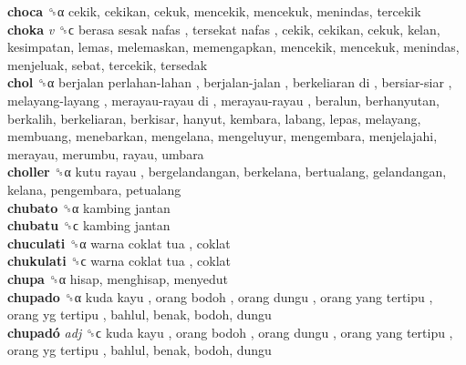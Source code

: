 \textbf{choca} ␝α  cekik, cekikan, cekuk, mencekik, mencekuk, menindas, tercekik  \\
\textbf{choka} \emph{v}  ␝ϲ   berasa sesak nafas ,  tersekat nafas , cekik, cekikan, cekuk, kelan, kesimpatan, lemas, melemaskan, memengapkan, mencekik, mencekuk, menindas, menjeluak, sebat, tercekik, tersedak  \\
\textbf{chol} ␝α   berjalan perlahan-lahan ,  berjalan-jalan ,  berkeliaran di ,  bersiar-siar ,  melayang-layang ,  merayau-rayau di ,  merayau-rayau , beralun, berhanyutan, berkalih, berkeliaran, berkisar, hanyut, kembara, labang, lepas, melayang, membuang, menebarkan, mengelana, mengeluyur, mengembara, menjelajahi, merayau, merumbu, rayau, umbara  \\
\textbf{choller} ␝α   kutu rayau , bergelandangan, berkelana, bertualang, gelandangan, kelana, pengembara, petualang  \\
\textbf{chubato} ␝α   kambing jantan   \\
\textbf{chubatu} ␝ϲ   kambing jantan   \\
\textbf{chuculati} ␝α   warna coklat tua , coklat  \\
\textbf{chukulati} ␝ϲ   warna coklat tua , coklat  \\
\textbf{chupa} ␝α  hisap, menghisap, menyedut  \\
\textbf{chupado} ␝α   kuda kayu ,  orang bodoh ,  orang dungu ,  orang yang tertipu ,  orang yg tertipu , bahlul, benak, bodoh, dungu  \\
\textbf{chupadó} \emph{adj}  ␝ϲ   kuda kayu ,  orang bodoh ,  orang dungu ,  orang yang tertipu ,  orang yg tertipu , bahlul, benak, bodoh, dungu  \\
